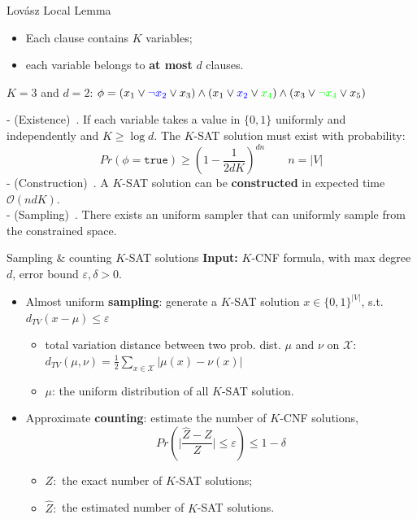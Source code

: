\documentclass[numfooter,aspectratio=169]{beamer}
\makeatletter
\def\mathcolor#1#{\@mathcolor{#1}}
\def\@mathcolor#1#2#3{%
  \protect\leavevmode
  \begingroup
    \color#1{#2}#3%
  \endgroup
}
\makeatother
\begin{document}
\begin{frame}{Lov\'asz Local Lemma}
\begin{itemize}
    \item Each clause contains $K$ variables;
    \item each variable belongs to \textbf{at most} $d$ clauses.
\end{itemize}
$K=3$ and $d=2$: $\phi=(x_1 \vee \mathcolor{blue}{\neg x_2} \vee x_3)\wedge (x_1 \vee \mathcolor{blue}{x_2} \vee \mathcolor{green}{x_4}) \wedge (x_3 \vee \mathcolor{green}{\neg x_4} \vee x_5) $
\begin{theorem}- (Existence)~\cite{erdHos1973problems}. If each variable takes a value in $\{0,1\}$ uniformly and independently and $K\ge \log d$. The $K$-SAT solution must exist with probability:
$$
Pr(\phi =\mathtt{true})\ge \left(1-\frac{1}{2dK}\right)^{dn}\qquad n=|V|
$$
- (Construction)~\cite{DBLP:journals/jacm/MoserT10}. A $K$-SAT solution can be \textbf{constructed} in expected time $\mathcal{O}(ndK)$. \\
- (Sampling)~\cite{DBLP:journals/jacm/GuoJL19,DBLP:conf/stoc/Feng0Y21}. There exists an uniform sampler that can uniformly sample from the constrained space. 
\end{theorem}
\end{frame}

\begin{frame}{Sampling \& counting $K$-SAT solutions}
\textbf{Input:} $K$-CNF formula, with max degree $d$, error bound $\varepsilon,\delta>0$.
\begin{itemize}
    \item Almost uniform \textbf{sampling}: generate a $K$-SAT solution $x\in\{0,1\}^{|V|}$, s.t. \\$d_{TV}(x-\mu)\le \varepsilon$
    \begin{itemize}
        \item total variation distance between two prob. dist. $\mu$ and $\nu$ on $\mathcal{X}$: $d_{TV}(\mu,\nu)=\frac{1}{2}\sum_{x\in\mathcal{X}}|\mu(x)-\nu(x)|$
        \item $\mu$: the uniform distribution of all $K$-SAT solution.
    \end{itemize}
    \item Approximate \textbf{counting}: estimate the number of $K$-CNF solutions,  
    $$Pr\left( \Big|\frac{\hat{Z}-Z}{Z}\Big|\le \varepsilon\right)\le 1-\delta$$
    \begin{itemize}
        \item $Z:$ the exact number of $K$-SAT solutions;
        \item $\hat{Z}:$ the estimated number of $K$-SAT solutions.
    \end{itemize}
\end{itemize}
\end{frame}
\end{document}
